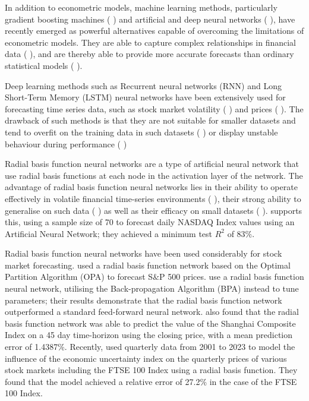 \documentclass[11pt,a4paper]{article}
\newcommand{\citeboth}[1]{\citeauthor{#1} \citep{#1}}
\begin{document}
In addition to econometric models, machine learning methods, 
particularly gradient boosting machines (\citeboth{gumelar,Liu2024,Chen2023}) and artificial and deep neural networks (\citeboth{chen2015lstm,kara2011ann,long2019deep,nelson2017lstm}), have recently emerged as powerful alternatives capable of overcoming the limitations of econometric models. 
They are able to capture complex relationships in financial data (\citeboth{rossi2018ml}), and 
are thereby able to provide more accurate forecasts than ordinary statistical models 
(\citeboth{lapitskaya2021armax}). 


Deep learning methods such as Recurrent neural networks (RNN) and Long Short-Term Memory (LSTM) neural networks
have been extensively used for forecasting time series data, 
such as stock market volatility (\citeboth{cho2022forecasting,praveenraj2023}) and prices (\citeboth{zhang2022lstm,song2023forecasting,dutta2024hybrid}). The drawback of such 
methods is that they are not suitable for smaller datasets and tend to overfit on the training data
in such datasets (\citeboth{foster1992}) or display unstable behaviour during performance (\citeboth{lebaron1998})

Radial basis function neural networks are a type of artificial 
neural network that use radial basis functions at each node in the 
activation layer of the network.
The advantage of radial basis function neural networks lies in their ability to 
operate effectively in volatile financial time-series 
environments (\citeboth{cafferata2019}), their strong ability to 
generalise on such data (\citeboth{sharkawy2020}) as well as their efficacy on small datasets (\citeboth{kosarac2022}). 
\citeboth{esfandyari2016}
supports this, using a sample size of 70 to forecast daily NASDAQ 
Index values using an Artificial Neural Network; they achieved a minimum
test $R^2$ of 83$\%$. 

Radial basis function neural networks have been used considerably for stock market forecasting. \citeboth{cao2004} 
used a radial basis function network based on the Optimal Partition Algorithm (OPA) to 
forecast S$\&$P 500 prices. \citeboth{dass2019} use a radial basis function neural network, utilising the Back-propagation 
Algorithm (BPA) instead to tune parameters; their results demonstrate 
that the radial basis function network outperformed a standard feed-forward neural network. 
\citeboth{ji2014} also found that the radial basis function network was able to predict the value 
of the Shanghai Composite Index on a 45 day time-horizon using the closing price, with a mean prediction error of 
1.4387$\%$. Recently, \citeboth{abotaleb2024}
used quarterly data from 2001 to 2023 to model the influence of the economic 
uncertainty index on the quarterly prices of various stock markets including the 
FTSE 100 Index using a radial basis function. They found that the model 
achieved a relative error of 27.2$\%$ in the case of the FTSE 100 Index.
\end{document}
